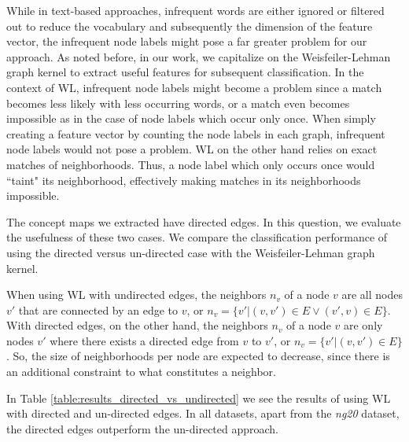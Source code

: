 While in text-based approaches, infrequent words are either ignored or filtered out to reduce the vocabulary and subsequently the dimension of the feature vector, the infrequent node labels might pose a far greater problem for our approach.
As noted before, in our work, we capitalize on the Weisfeiler-Lehman graph kernel to extract useful features for subsequent classification.
In the context of WL, infrequent node labels might become a problem since a match becomes less likely with less occurring words, or a match even becomes impossible as in the case of node labels which occur only once.
When simply creating a feature vector by counting the node labels in each graph, infrequent node labels would not pose a problem.
WL on the other hand relies on exact matches of neighborhoods.
Thus, a node label which only occurs once would ``taint" its neighborhood, effectively making matches in its neighborhoods impossible.


The concept maps we extracted have directed edges.
In this question, we evaluate the usefulness of these two cases.
We compare the classification performance of using the directed versus un-directed case with the Weisfeiler-Lehman graph kernel.

When using WL with undirected edges, the neighbors $n_v$ of a node $v$ are all nodes $v'$ that are connected by an edge to $v$, or $n_v = \{v' | (v, v') \in E \lor (v', v ) \in E \}$.
With directed edges, on the other hand, the neighbors $n_v$ of a node $v$ are only nodes $v'$ where there exists a directed edge from $v$ to $v'$, or $n_v = \{v' | (v, v') \in E \}$.
So, the size of neighborhoods per node are expected to decrease, since there is an additional constraint to what constitutes a neighbor.

In Table \ref{table:results_directed_vs_undirected} we see the results of using WL with directed and un-directed edges.
In all datasets, apart from the \textit{ng20} dataset, the directed edges outperform the un-directed approach.

